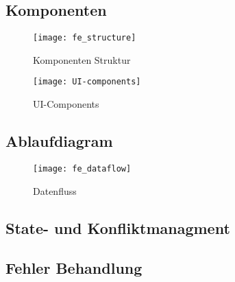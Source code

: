 \subsection{Komponenten}

\begin{figure}[H]
    \centering
    \texttt{[image: fe\_structure]}
    \caption{Komponenten Struktur}
    \label{fig: Fe_Structure}
\end{figure}


\begin{figure}[H]
    \centering
    \texttt{[image: UI-components]}
    \caption{UI-Components}
    \label{fig: UI-Components}
\end{figure}

\subsection{Ablaufdiagram}

\begin{figure}[H]
    \texttt{[image: fe\_dataflow]}
    \caption{Datenfluss}
    \label{fig:}
\end{figure}


\subsection{State- und Konfliktmanagment}

\subsection{Fehler Behandlung}
